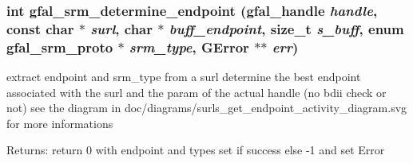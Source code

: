\subsubsection{\setlength{\rightskip}{0pt plus 5cm}int gfal\_\-srm\_\-determine\_\-endpoint (gfal\_\-handle {\em handle}, const char $\ast$ {\em surl}, char $\ast$ {\em buff\_\-endpoint}, size\_\-t {\em s\_\-buff}, enum gfal\_\-srm\_\-proto $\ast$ {\em srm\_\-type}, GError $\ast$$\ast$ {\em err})}\label{gfal__common__srm__endpoint_8h_d4518c44afa2a953bea3701d26ae7e9e}


extract endpoint and srm\_\-type from a surl determine the best endpoint associated with the surl and the param of the actual handle (no bdii check or not) see the diagram in doc/diagrams/surls\_\-get\_\-endpoint\_\-activity\_\-diagram.svg for more informations 

\begin{Desc}
\item[Returns:]return 0 with endpoint and types set if success else -1 and set Error \end{Desc}

